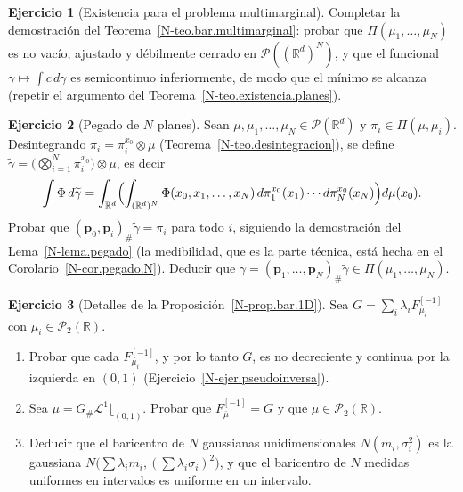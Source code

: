 \documentclass[11pt,a4paper]{amsart}
\newcounter{chapter}
\newcommand{\R}{{\mathbb R}}
\newcommand{\LL}{{\mathcal L}}
\newcommand{\pp}{{\mathbf p}}
\theoremstyle{remark}
\theoremstyle{definition}
\newtheorem{ejercicio}{Ejercicio}[chapter]
\numberwithin{subsection}{section}
\numberwithin{equation}{section}
\begin{document}
\begin{ejercicio}[Existencia para el problema multimarginal]\label{ejer.bar.multimarginal.existencia}
Completar la demostración del Teorema~\ref{N-teo.bar.multimarginal}:
probar que $\Pi(\mu_1,\dots,\mu_N)$ es no vacío, ajustado y débilmente
cerrado en $\mathcal P((\R^d)^N)$, y que el funcional $\gamma\mapsto\int c\,d\gamma$
es semicontinuo inferiormente, de modo que el mínimo se alcanza (repetir el
argumento del Teorema~\ref{N-teo.existencia.planes}).
\end{ejercicio}

\begin{ejercicio}[Pegado de $N$ planes]\label{ejer.pegado.N}
Sean $\mu,\mu_1,\dots,\mu_N\in\mathcal P(\R^d)$ y $\pi_i\in\Pi(\mu,\mu_i)$.
Desintegrando $\pi_i=\pi_i^{x_0}\otimes\mu$
(Teorema~\ref{N-teo.desintegracion}), se define
$\widetilde\gamma=\bigl(\bigotimes_{i=1}^N\pi_i^{x_0}\bigr)\otimes\mu$,
es decir
\[
\int\Phi\,d\widetilde\gamma
=\int_{\R^d}\Bigl(\int_{(\R^d)^N}\Phi(x_0,x_1,\dots,x_N)\,d\pi_1^{x_0}(x_1)\cdots d\pi_N^{x_0}(x_N)\Bigr)d\mu(x_0).
\]
Probar que $(\pp_0,\pp_i)_\#\widetilde\gamma=\pi_i$
para todo $i$, siguiendo la demostración del Lema~\ref{N-lema.pegado} (la
medibilidad, que es la parte técnica, está hecha en el
Corolario~\ref{N-cor.pegado.N}). Deducir
que $\gamma=(\pp_1,\dots,\pp_N)_\#\widetilde\gamma\in\Pi(\mu_1,\dots,\mu_N)$.
\end{ejercicio}

\begin{ejercicio}[Detalles de la Proposición~\ref{N-prop.bar.1D}]\label{ejer.bar.pseudoinversa}
Sea $G=\sum_i\lambda_iF_{\mu_i}^{[-1]}$ con $\mu_i\in\mathcal P_2(\R)$.
\begin{enumerate}[label=(\alph*)]
\item Probar que cada $F_{\mu_i}^{[-1]}$, y por lo tanto $G$, es no
decreciente y continua por la izquierda en $(0,1)$
(Ejercicio~\ref{N-ejer.pseudoinversa}).
\item Sea $\bar\mu=G_\#\LL^1\lfloor_{(0,1)}$. Probar que
$F_{\bar\mu}^{[-1]}=G$ y que $\bar\mu\in\mathcal P_2(\R)$.
\item Deducir que el baricentro de $N$ gaussianas unidimensionales
$N(m_i,\sigma_i^2)$ es la gaussiana $N\bigl(\sum\lambda_im_i,(\sum\lambda_i\sigma_i)^2\bigr)$,
y que el baricentro de $N$ medidas uniformes en intervalos es uniforme en
un intervalo.
\end{enumerate}
\end{ejercicio}
\end{document}
